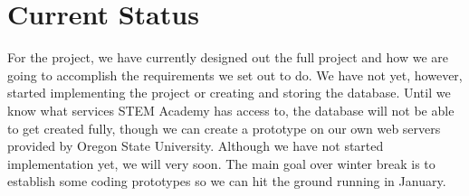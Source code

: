 \documentclass[letterpaper,10pt,serif, draftclsnofoot,onecolumn, compsoc, titlepage]{IEEEtran}
\begin{document}
\section{Current Status}
For the project, we have currently designed out the full project and how we are going to accomplish the requirements we set out to do.
We have not yet, however, started implementing the project or creating and storing the database.
Until we know what services STEM Academy has access to, the database will not be able to get created fully, though we can create a prototype on our own web servers provided by Oregon State University.
Although we have not started implementation yet, we will very soon. The main goal over winter break is to establish some coding prototypes so we can hit the ground running in January. 
\end{document}
